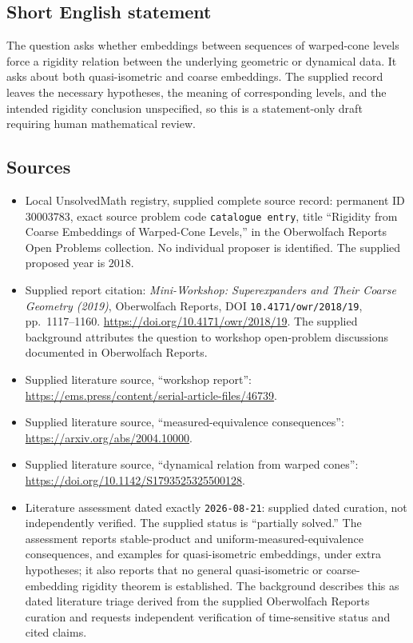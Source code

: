 \documentclass[11pt]{article}
\begin{document}
\subsection{Short English statement}
The question asks whether embeddings between sequences of warped-cone levels force a rigidity relation between the underlying geometric or dynamical data. It asks about both quasi-isometric and coarse embeddings. The supplied record leaves the necessary hypotheses, the meaning of corresponding levels, and the intended rigidity conclusion unspecified, so this is a statement-only draft requiring human mathematical review.
\subsection{Sources}
\begin{itemize}
\item Local UnsolvedMath registry, supplied complete source record: permanent ID \(30003783\), exact source problem code \texttt{catalogue entry}, title ``Rigidity from Coarse Embeddings of Warped-Cone Levels,'' in the Oberwolfach Reports Open Problems collection. No individual proposer is identified. The supplied proposed year is \(2018\).
\item Supplied report citation: \emph{Mini-Workshop: Superexpanders and Their Coarse Geometry (2019)}, Oberwolfach Reports, DOI \texttt{10.4171/owr/2018/19}, pp.\ 1117--1160. \url{https://doi.org/10.4171/owr/2018/19}. The supplied background attributes the question to workshop open-problem discussions documented in Oberwolfach Reports.
\item Supplied literature source, ``workshop report'': \url{https://ems.press/content/serial-article-files/46739}.
\item Supplied literature source, ``measured-equivalence consequences'': \url{https://arxiv.org/abs/2004.10000}.
\item Supplied literature source, ``dynamical relation from warped cones'': \url{https://doi.org/10.1142/S1793525325500128}.
\item Literature assessment dated exactly \texttt{2026-08-21}: supplied dated curation, not independently verified. The supplied status is ``partially solved.'' The assessment reports stable-product and uniform-measured-equivalence consequences, and examples for quasi-isometric embeddings, under extra hypotheses; it also reports that no general quasi-isometric or coarse-embedding rigidity theorem is established. The background describes this as dated literature triage derived from the supplied Oberwolfach Reports curation and requests independent verification of time-sensitive status and cited claims.
\end{itemize}
\end{document}
